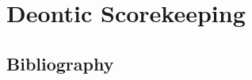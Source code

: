 \documentclass[11pt,twoside]{article}
\begin{document}
\cite{linell_asymmetries_1991}

\section{Deontic Scorekeeping}

\begin{abstract}

\end{abstract}


\clearpage
\appendix
\begin{appendices}
\section{Bibliography}
\printbibliography[heading=none]
\end{appendices}
\end{document}
